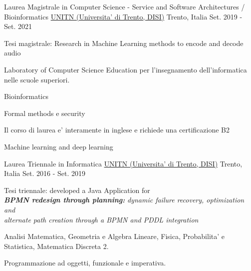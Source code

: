 

\begin{cventries}


  \cventry
    {Laurea Magistrale in Computer Science - Service and Software Architectures / Bioinformatics} %
    {\href{https://www.unitn.it/}{UNITN (Universita' di Trento, DISI)}}  %
    {Trento, Italia} %
    {Set. 2019 - Set. 2021} %
    {
      \begin{cvitems} %
        \item {Tesi magistrale: Research in Machine Learning methods to encode and decode audio}
        \item {Laboratory of Computer Science Education per l'insegnamento dell'informatica nelle scuole superiori.}
        \item {Bioinformatics}
        \item {Formal methods e security}
        \item {Il corso di laurea e' interamente in inglese e richiede una certificazione B2}
        \item {Machine learning and deep learning}
      \end{cvitems}
    }

  \cventry
    {Laurea Triennale in Informatica} %
    {\href{https://www.unitn.it/}{UNITN (Universita' di Trento, DISI)}}  %
    {Trento, Italia} %
    {Set. 2016 - Set. 2019} %
    {
      \begin{cvitems} %
        \item {Tesi triennale: developed a Java Application for \\ \textbf{\textit{BPMN redesign through planning:}} \textit{dynamic failure recovery, optimization and} \\ \textit{alternate path creation through a BPMN and PDDL integration}}
        \item Analisi Matematica, Geometria e Algebra Lineare, Fisica, Probabilita' e Statistica, Matematica Discreta 2.
        \item Programmazione ad oggetti, funzionale e imperativa.
      \end{cvitems}
    }


\end{cventries}
